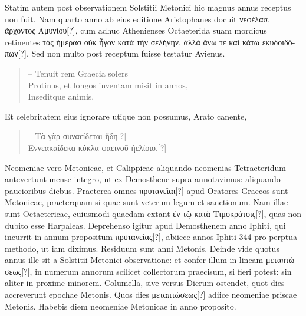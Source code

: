 Statim autem post observationem
Solstitii Metonici hic magnus annus receptus non fuit.
Nam quarto anno ab eius editione Aristophanes docuit
 \textgreek{νεφέλασ, ἄρχοντος
Αμυνίου[?]},
cum adhuc Athenienses Octaeterida suam mordicus
retinentes \textgreek{τὰς ἡμέρασ οὐκ ἦγον κατὰ τήν σελήνην,
 ἀλλὰ ἄνω τε καὶ κάτω εκυδοιδόπων[?]}.
Sed non multo post receptum fuisse testatur Avienus.
\begin{quote}
-- Tenuit rem Graecia solers\\
Protinus, et longos inventam misit in annos,\\
Inseditque animis.
\end{quote}
Et celebritatem eius ignorare utique non possumus, Arato canente,
\begin{quote}
-- \textgreek{Τὰ γὰρ συναείδεται ἤδη[?]}\\
\textgreek{Εννεακαίδεκα κύκλα φαεινοῦ ἠελίοιο.[?]}
\end{quote}
Neomeniae vero Metonicae, et Calippicae aliquando neomenias Tetraeteridum
antevertunt mense integro, ut ex Demosthene supra annotavimus:
aliquando paucioribus diebus.
Praeterea omnes \textgreek{πρυτανεῖαι[?]}
apud Oratores Graecos sunt Metonicae, praeterquam si quae sunt veterum
legum et sanctionum.
Nam illae sunt Octaetericae, cuiusmodi
quaedam extant \textgreek{ἐν τῷ κατὰ Τιμοκράτοις[?]},
 quas non dubito esse Harpaleas.
Deprehenso igitur apud Demosthenem anno Iphiti, qui incurrit in
annum propositum \textgreek{πρυτανείας[?]}, abiiece annos Iphiti 344 pro perptua
methodo, ut iam diximus.
Residuum sunt anni Metonis.
Deinde
vide quotus annus ille sit a Solstitii Metonici
observatione: et confer illum in lineam
\textgreek{μεταπτώσεως[?]}, in numerum annorum scilicet collectorum
praecisum, si fieri potest: sin aliter in proxime
minorem.
Columella, sive versus Dierum
ostendet, quot dies accreverunt epochae Metonis.
Quos dies \textgreek{μεταπτώσεως[?]} adiice neomeniae priscae
Metonis.
Habebis diem neomeniae Metonicae
in anno proposito.
\begin{table}[htb]
 
\end{table}

